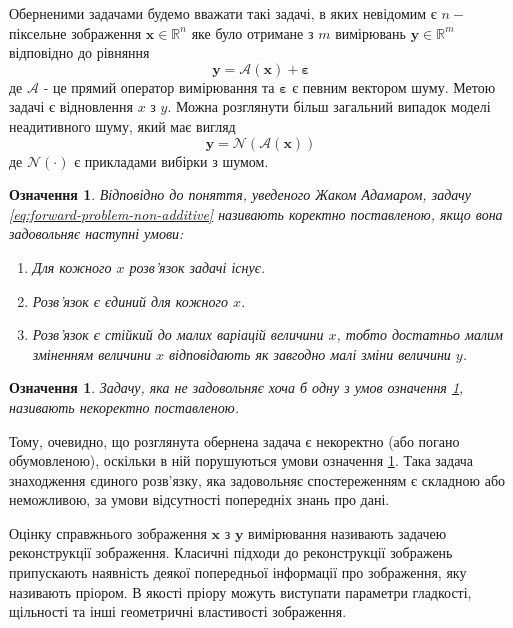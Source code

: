 \documentclass[14pt,a4paper]{extarticle}
\newcounter{e}
\newtheorem{defn}[theorem]{Означення}
\numberwithin{equation}{section}
\numberwithin{figure}{section}
\begin{document}
	
	Оберненими задачами будемо вважати такі задачі, в яких невідомим є $n-$ піксельне зображення $\boldsymbol{x} \in \mathbb{R}^{n}$ яке було отримане з $m$ вимірювань $\boldsymbol{y} \in \mathbb{R}^{m}$ відповідно до рівняння
	\begin{equation}
	\label{eq:forward-problem}
	\boldsymbol{y}=\mathcal{A}\left(\boldsymbol{x}\right)+\boldsymbol{\varepsilon}
	\end{equation}
	де $\mathcal{A}$ - це прямий оператор вимірювання та $\boldsymbol{\varepsilon}$ є певним вектором шуму. Метою задачі є відновлення $x$ з $y$. Можна розглянути більш загальний випадок моделі неадитивного шуму, який має вигляд 
	\begin{equation}
	\label{eq:forward-problem-non-additive}
	\boldsymbol{y}=\mathcal{N}\left(\mathcal{A}\left(\boldsymbol{x}\right)\right)
	\end{equation}
	де $\mathcal{N}(\cdot)$ є прикладами вибірки з шумом.


	\begin{defn}
		\label{def:well-posed}
		Відповідно до поняття, уведеного Жаком Адамаром, задачу \ref{eq:forward-problem-non-additive} називають коректно поставленою, якщо вона задовольняє наступні умови: 
		\begin{enumerate}
			\item Для кожного $x$ розв'язок задачі існує.
			\item Розв'язок є єдиний для кожного $x$.
			\item Розв'язок є стійкий до малих варіацій величини $x$, тобто достатньо малим зміненням величини $x$ відповідають як завгодно малі зміни величини $y$.
		\end{enumerate}
	\end{defn}

	\begin{defn}
		\label{def:ill-posed}	
		Задачу, яка не задовольняє хоча б одну з умов означення \ref{def:well-posed}, називають некоректно поставленою.
	\end{defn}

	Тому, очевидно, що розглянута обернена задача є некоректно (або погано обумовленою), оскільки в ній порушуються умови означення \ref{def:well-posed}. Така задача знаходження єдиного розв'язку, яка задовольняє спостереженням є складною або неможливою, за умови відсутності попередніх знань про дані.

	Оцінку справжнього зображення $\boldsymbol{x}$ з $\boldsymbol{y}$  вимірювання називають задачею реконструкції зображення. Класичні підходи до реконструкції зображень припускають наявність деякої попередньої інформації про зображення, яку називають пріором. В якості пріору можуть виступати параметри гладкості, щільності та інші геометричні властивості зображення.
\end{document}
